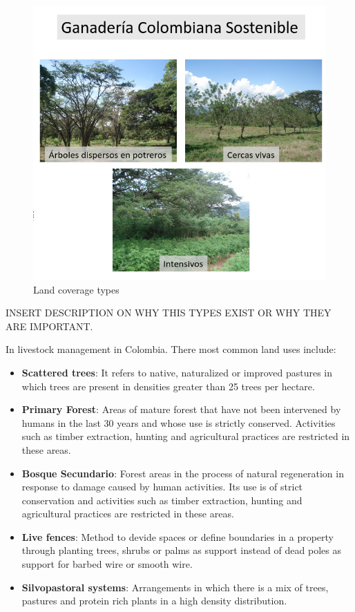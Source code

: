 \documentclass[
]{jss}
\providecommand{\tightlist}{%
  \setlength{\itemsep}{0pt}\setlength{\parskip}{0pt}}
\begin{document}
\begin{figure}
\centering
\includegraphics{figures/land-coverage.png}
\caption{Land coverage types}
\end{figure}

INSERT DESCRIPTION ON WHY THIS TYPES EXIST OR WHY THEY ARE IMPORTANT.

In livestock management in Colombia. There most common land uses
include:

\begin{itemize}
\tightlist
\item
  \textbf{Scattered trees}: It refers to native, naturalized or improved
  pastures in which trees are present in densities greater than 25 trees
  per hectare.
\item
  \textbf{Primary Forest}: Areas of mature forest that have not been
  intervened by humans in the last 30 years and whose use is strictly
  conserved. Activities such as timber extraction, hunting and
  agricultural practices are restricted in these areas.
\item
  \textbf{Bosque Secundario}: Forest areas in the process of natural
  regeneration in response to damage caused by human activities. Its use
  is of strict conservation and activities such as timber extraction,
  hunting and agricultural practices are restricted in these areas.
\item
  \textbf{Live fences}: Method to devide spaces or define boundaries in
  a property through planting trees, shrubs or palms as support instead
  of dead poles as support for barbed wire or smooth wire.
\item
  \textbf{Silvopastoral systems}: Arrangements in which there is a mix
  of trees, pastures and protein rich plants in a high density
  distribution.
\end{itemize}
\end{document}

